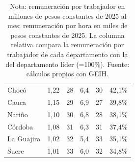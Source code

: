 \begin{table}[H]
\begin{tabular}{lrrrrr}
Chocó & 1,22 & 28 & 6,4 & 30 & 42,1\% \\
Cauca & 1,15 & 29 & 6,9 & 27 & 39,8\% \\
Nariño & 1,10 & 30 & 6,8 & 28 & 38,1\% \\
Córdoba & 1,08 & 31 & 6,3 & 31 & 37,4\% \\
La Guajira & 1,02 & 32 & 5,4 & 33 & 35,1\% \\
Sucre & 1,01 & 33 & 6,0 & 32 & 34,8\% \\
\bottomrule
\end{tabular}
\caption*{\footnotesize Nota: remuneración por trabajador en millones de pesos constantes de 2025 al mes; remuneración por hora en miles de pesos constantes de 2025. La columna relativa compara la remuneración por trabajador de cada departamento con la del departamento líder (=100\%). Fuente: cálculos propios con GEIH.}
\end{table}